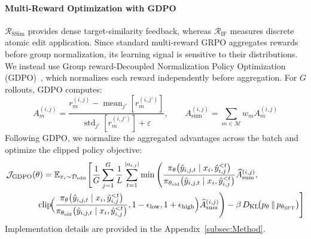 

\paragraph{Multi-Reward Optimization with GDPO} 
$\mathcal{R}_{\mathrm{SSim}}$ provides dense target-similarity feedback, whereas $\mathcal{R}_{\mathrm{IF}}$ measures discrete atomic edit application. Since standard multi-reward GRPO aggregates rewards before group normalization, its learning signal is sensitive to their distributions. We instead use Group reward-Decoupled Normalization Policy Optimization (GDPO)~\citep{liu2026gdpogrouprewarddecouplednormalization}, which normalizes each reward independently before aggregation. For $G$ rollouts, GDPO computes:
\begin{equation}
A_m^{(i,j)}
=
\frac{
r_m^{(i,j)}-\operatorname{mean}_{j'}[r_m^{(i,j')}]
}{
\operatorname{std}_{j'}[r_m^{(i,j')}]+\varepsilon
},
\qquad
A_{\mathrm{sum}}^{(i,j)}
=
\sum_{m\in\mathcal{M}} w_m A_m^{(i,j)}
\label{eq:gdpo_reward_adv}
\end{equation}
Following GDPO, we normalize the aggregated advantages across the batch and optimize the clipped policy objective:
\begin{align}
\mathcal{J}_{\mathrm{GDPO}}(\theta)
=
\mathbb{E}_{x_i \sim \mathcal{D}_{\mathrm{edit}}}
\Bigg[
\frac{1}{G}
\sum_{j=1}^{G}
\frac{1}{L}
\sum_{t=1}^{|o_{i,j}|}
\min\Bigg(
&\frac{
\pi_{\theta}
\!\left(\hat{y}_{i,j,t}\mid x_i,\hat{y}_{i,j}^{<t}\right)
}{
\pi_{\theta_{\mathrm{old}}}
\!\left(\hat{y}_{i,j,t}\mid x_i,\hat{y}_{i,j}^{<t}\right)
}
 \widehat{A}_{\mathrm{sum}}^{(i,j)}, \nonumber\\
&\hspace{-15em}\operatorname{clip}\!\Bigl(
\frac{
\pi_{\theta}
\!\left(\hat{y}_{i,j,t}\mid x_i,\hat{y}_{i,j}^{<t}\right)
}{
\pi_{\theta_{\mathrm{old}}}
\!\left(\hat{y}_{i,j,t}\mid x_i,\hat{y}_{i,j}^{<t}\right)
},
1-\epsilon_{\mathrm{low}},
1+\epsilon_{\mathrm{high}}
\Bigr)
\widehat{A}_{\mathrm{sum}}^{(i,j)}
\Bigg) \nonumber 
  - \beta\,D_{\text{KL}}\!\big(p_\theta \,\|\, p_{\theta_{\text{SFT}}}\big)
\Bigg]
\label{eq:gdpo_objective}
\end{align}
Implementation details are provided in the Appendix~\ref{subsec:Method}.